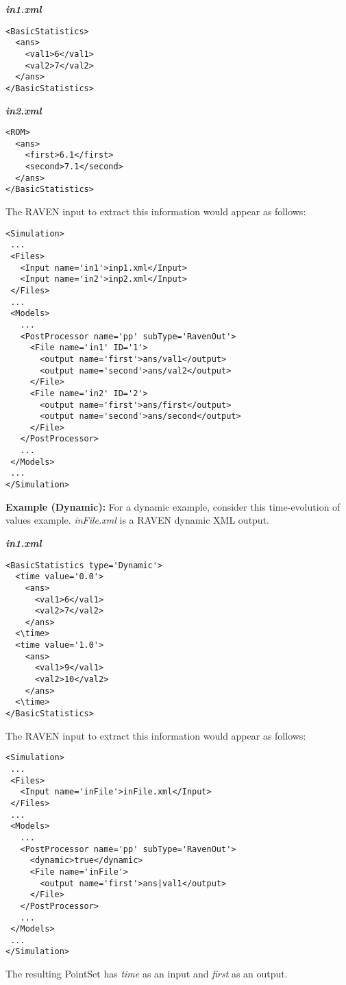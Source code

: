\textbf{\emph{in1.xml}}
\begin{lstlisting}[style=XML]
<BasicStatistics>
  <ans>
    <val1>6</val1>
    <val2>7</val2>
  </ans>
</BasicStatistics>
\end{lstlisting}
\textbf{\emph{in2.xml}}
\begin{lstlisting}[style=XML]
<ROM>
  <ans>
    <first>6.1</first>
    <second>7.1</second>
  </ans>
</BasicStatistics>
\end{lstlisting}
The RAVEN input to extract this information would appear as follows:
\begin{lstlisting}[style=XML]
<Simulation>
 ...
 <Files>
   <Input name='in1'>inp1.xml</Input>
   <Input name='in2'>inp2.xml</Input>
 </Files>
 ...
 <Models>
   ...
   <PostProcessor name='pp' subType='RavenOut'>
     <File name='in1' ID='1'>
       <output name='first'>ans/val1</output>
       <output name='second'>ans/val2</output>
     </File>
     <File name='in2' ID='2'>
       <output name='first'>ans/first</output>
       <output name='second'>ans/second</output>
     </File>
   </PostProcessor>
   ...
 </Models>
 ...
</Simulation>
\end{lstlisting}

\textbf{Example (Dynamic):}
For a dynamic example, consider this time-evolution of values example.  \emph{inFile.xml} is a RAVEN dynamic
XML output.

\textbf{\emph{in1.xml}}
\begin{lstlisting}[style=XML]
<BasicStatistics type='Dynamic'>
  <time value='0.0'>
    <ans>
      <val1>6</val1>
      <val2>7</val2>
    </ans>
  <\time>
  <time value='1.0'>
    <ans>
      <val1>9</val1>
      <val2>10</val2>
    </ans>
  <\time>
</BasicStatistics>
\end{lstlisting}
The RAVEN input to extract this information would appear as follows:
\begin{lstlisting}[style=XML]
<Simulation>
 ...
 <Files>
   <Input name='inFile'>inFile.xml</Input>
 </Files>
 ...
 <Models>
   ...
   <PostProcessor name='pp' subType='RavenOut'>
     <dynamic>true</dynamic>
     <File name='inFile'>
       <output name='first'>ans|val1</output>
     </File>
   </PostProcessor>
   ...
 </Models>
 ...
</Simulation>
\end{lstlisting}
The resulting PointSet has \emph{time} as an input and \emph{first} as an output.


